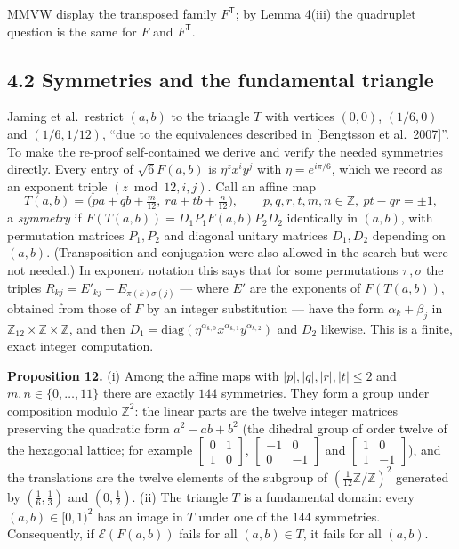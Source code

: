 \documentclass[
  11pt,
]{article}
\begin{document}
MMVW display the transposed family \(F^{\mathsf T}\); by Lemma 4(iii)
the quadruplet question is the same for \(F\) and \(F^{\mathsf T}\).

\subsection{4.2 Symmetries and the fundamental
triangle}\label{symmetries-and-the-fundamental-triangle}

Jaming et al.~restrict \((a,b)\) to the triangle \(T\) with vertices
\((0,0)\), \((1/6,0)\) and \((1/6,1/12)\), ``due to the equivalences
described in {[}Bengtsson et al.~2007{]}''. To make the re-proof
self-contained we derive and verify the needed symmetries directly.
Every entry of \(\sqrt6F(a,b)\) is \(\eta^{z}x^{i}y^{j}\) with
\(\eta=e^{i\pi/6}\), which we record as an exponent triple
\((z\bmod12,i,j)\). Call an affine map \[
T(a,b)=\Big(pa+qb+\tfrac{m}{12},\ ra+tb+\tfrac{n}{12}\Big),\qquad p,q,r,t,m,n\in\mathbb Z,\ pt-qr=\pm1,
\] a \emph{symmetry} if \(F(T(a,b))=D_1P_1F(a,b)P_2D_2\) identically in
\((a,b)\), with permutation matrices \(P_1,P_2\) and diagonal unitary
matrices \(D_1,D_2\) depending on \((a,b)\). (Transposition and
conjugation were also allowed in the search but were not needed.) In
exponent notation this says that for some permutations \(\pi,\sigma\)
the triples \(R_{kj}=E'_{kj}-E_{\pi(k)\sigma(j)}\) --- where \(E'\) are
the exponents of \(F(T(a,b))\), obtained from those of \(F\) by an
integer substitution --- have the form \(\alpha_k+\beta_j\) in
\(\mathbb Z_{12}\times\mathbb Z\times\mathbb Z\), and then
\(D_1=\mathrm{diag}(\eta^{\alpha_{k,0}}x^{\alpha_{k,1}}y^{\alpha_{k,2}})\)
and \(D_2\) likewise. This is a finite, exact integer computation.

\textbf{Proposition 12.} (i) Among the affine maps with
\(|p|,|q|,|r|,|t|\le2\) and \(m,n\in\{0,\dots,11\}\) there are exactly
\(144\) symmetries. They form a group under composition modulo
\(\mathbb Z^2\): the linear parts are the twelve integer matrices
preserving the quadratic form \(a^2-ab+b^2\) (the dihedral group of
order twelve of the hexagonal lattice; for example
\(\begin{bmatrix}0&1\\1&0\end{bmatrix}\),
\(\begin{bmatrix}-1&0\\0&-1\end{bmatrix}\) and
\(\begin{bmatrix}1&0\\1&-1\end{bmatrix}\)), and the translations are the
twelve elements of the subgroup of
\((\tfrac1{12}\mathbb Z/\mathbb Z)^2\) generated by
\((\tfrac16,\tfrac13)\) and \((0,\tfrac12)\). (ii) The triangle \(T\) is
a fundamental domain: every \((a,b)\in[0,1)^2\) has an image in \(T\)
under one of the \(144\) symmetries. Consequently, if
\(\mathcal E(F(a,b))\) fails for all \((a,b)\in T\), it fails for all
\((a,b)\).
\end{document}
